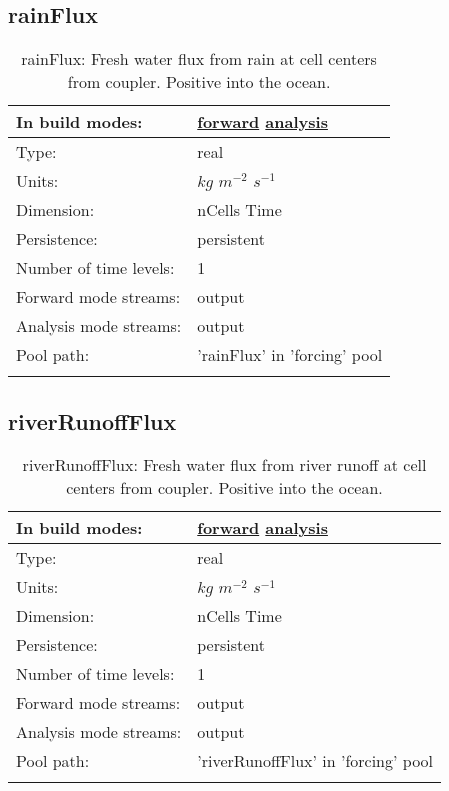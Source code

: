 \subsection[rainFlux]{rainFlux}
\label{subsec:var_sec_forcing_rainFlux}
\begin{center}
\begin{longtable}{| p{2.0in} | p{4.0in} |}
        \hline 
        In build modes: & \hyperref[subsec:forward_var_tab_forcing]{forward} \hyperref[subsec:analysis_var_tab_forcing]{analysis} \\
        \hline 
        Type: & real \\
        \hline 
        Units: & $kg$ $m^{-2}$ $s^{-1}$ \\
        \hline 
        Dimension: & nCells Time \\
        \hline 
        Persistence: & persistent \\
        \hline 
        Number of time levels: & 1 \\
        \hline 
		 Forward mode streams: &  output \\
        \hline 
		 Analysis mode streams: &  output \\
        \hline 
            Pool path: & 'rainFlux' in 'forcing' pool
 \\
		 \hline 
    \caption{rainFlux: Fresh water flux from rain at cell centers from coupler. Positive into the ocean.}
\end{longtable}
\end{center}
\subsection[riverRunoffFlux]{riverRunoffFlux}
\label{subsec:var_sec_forcing_riverRunoffFlux}
\begin{center}
\begin{longtable}{| p{2.0in} | p{4.0in} |}
        \hline 
        In build modes: & \hyperref[subsec:forward_var_tab_forcing]{forward} \hyperref[subsec:analysis_var_tab_forcing]{analysis} \\
        \hline 
        Type: & real \\
        \hline 
        Units: & $kg$ $m^{-2}$ $s^{-1}$ \\
        \hline 
        Dimension: & nCells Time \\
        \hline 
        Persistence: & persistent \\
        \hline 
        Number of time levels: & 1 \\
        \hline 
		 Forward mode streams: &  output \\
        \hline 
		 Analysis mode streams: &  output \\
        \hline 
            Pool path: & 'riverRunoffFlux' in 'forcing' pool
 \\
		 \hline 
    \caption{riverRunoffFlux: Fresh water flux from river runoff at cell centers from coupler. Positive into the ocean.}
\end{longtable}
\end{center}
